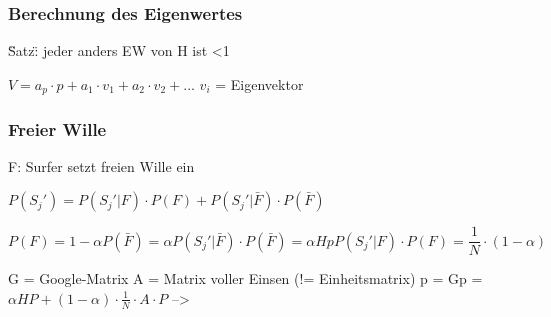 \documentclass[10pt,a4paper]{scrartcl}
\begin{document}
\subsubsection{Berechnung des Eigenwertes}
\"Satz\": jeder anders EW von H ist <1 %

$V = a_{p}\cdot p + a_{1}\cdot v_{1} + a_{2}\cdot v_{2} + ...$
$v_{i}$ = Eigenvektor

\subsubsection{Freier Wille}
F: Surfer setzt freien Wille ein

$P(S_{j}') = P(S_{j}'|F)\cdot P(F) + P(S_{j}'|\bar{F})\cdot P(\bar{F})$

$$P(F) = 1-\alpha
P(\bar{F}) = \alpha
P(S_{j}'|\bar{F})\cdot P(\bar{F}) = \alpha Hp
P(S_{j}'|F)\cdot P(F) = \frac{1}{N}\cdot (1-\alpha)$$

G = Google-Matrix
A = Matrix voller Einsen (!= Einheitsmatrix)
p = Gp = $\alpha HP + (1-\alpha)\cdot \frac{1}{N}\cdot A\cdot P$ --> 
\end{document}
